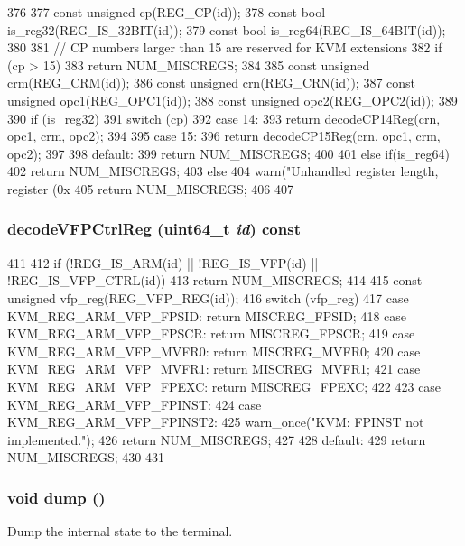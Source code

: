 \begin{DoxyCode}
376 {
377     const unsigned cp(REG_CP(id));
378     const bool is_reg32(REG_IS_32BIT(id));
379     const bool is_reg64(REG_IS_64BIT(id));
380 
381     // CP numbers larger than 15 are reserved for KVM extensions
382     if (cp > 15)
383         return NUM_MISCREGS;
384 
385     const unsigned crm(REG_CRM(id));
386     const unsigned crn(REG_CRN(id));
387     const unsigned opc1(REG_OPC1(id));
388     const unsigned opc2(REG_OPC2(id));
389 
390     if (is_reg32) {
391         switch (cp) {
392           case 14:
393             return decodeCP14Reg(crn, opc1, crm, opc2);
394 
395           case 15:
396             return decodeCP15Reg(crn, opc1, crm, opc2);
397 
398           default:
399             return NUM_MISCREGS;
400         }
401     } else if(is_reg64) {
402         return NUM_MISCREGS;
403     } else {
404         warn("Unhandled register length, register (0x%
405         return NUM_MISCREGS;
406     }
407 }
\end{DoxyCode}
\hypertarget{classArmKvmCPU_acf6fe05c1274f3c7d8d6b452f193522b}{
\subsubsection[{decodeVFPCtrlReg}]{ decodeVFPCtrlReg (uint64\_\-t {\em id}) const}}
\label{classArmKvmCPU_acf6fe05c1274f3c7d8d6b452f193522b}



\begin{DoxyCode}
411 {
412     if (!REG_IS_ARM(id) || !REG_IS_VFP(id) || !REG_IS_VFP_CTRL(id))
413         return NUM_MISCREGS;
414 
415     const unsigned vfp_reg(REG_VFP_REG(id));
416     switch (vfp_reg) {
417       case KVM_REG_ARM_VFP_FPSID: return MISCREG_FPSID;
418       case KVM_REG_ARM_VFP_FPSCR: return MISCREG_FPSCR;
419       case KVM_REG_ARM_VFP_MVFR0: return MISCREG_MVFR0;
420       case KVM_REG_ARM_VFP_MVFR1: return MISCREG_MVFR1;
421       case KVM_REG_ARM_VFP_FPEXC: return MISCREG_FPEXC;
422 
423       case KVM_REG_ARM_VFP_FPINST:
424       case KVM_REG_ARM_VFP_FPINST2:
425         warn_once("KVM: FPINST not implemented.\n");
426         return NUM_MISCREGS;
427 
428       default:
429         return NUM_MISCREGS;
430     }
431 }
\end{DoxyCode}
\hypertarget{classArmKvmCPU_accd2600060dbaee3a3b41aed4034c63c}{
\subsubsection[{dump}]{\setlength{\rightskip}{0pt plus 5cm}void dump ()}}
\label{classArmKvmCPU_accd2600060dbaee3a3b41aed4034c63c}
Dump the internal state to the terminal. 

